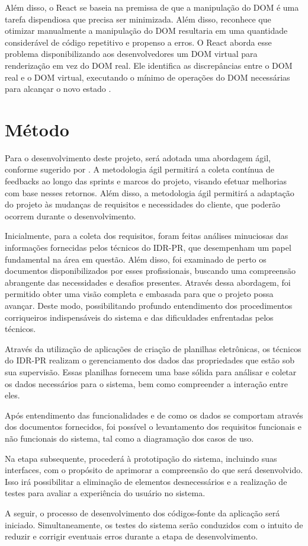 Além disso, o React se baseia na premissa de que a manipulação do \gls{DOM} é uma tarefa dispendiosa que precisa ser minimizada. Além disso, reconhece que otimizar manualmente a manipulação do \gls{DOM} resultaria em uma quantidade considerável de código repetitivo e propenso a erros. O React aborda esse problema disponibilizando aos desenvolvedores um \gls{DOM} virtual para renderização em vez do \gls{DOM} real. Ele identifica as discrepâncias entre o \gls{DOM} real e o \gls{DOM} virtual, executando o mínimo de operações do \gls{DOM} necessárias para alcançar o novo estado \cite{Vipul:2016:ReactJSByExampleBuildingModernWebApplications}.

\section{Método}\label{sec:metodo}

Para o desenvolvimento deste projeto, será adotada uma abordagem ágil, conforme sugerido por . A metodologia ágil permitirá a coleta contínua de feedbacks ao longo das sprints e marcos do projeto, visando efetuar melhorias com base nesses retornos.
Além disso, a metodologia ágil permitirá a adaptação do projeto às mudanças de requisitos e necessidades do cliente, que poderão ocorrem durante o desenvolvimento.

Inicialmente, para a coleta dos requisitos, foram feitas análises minuciosas das informações fornecidas pelos técnicos do \gls{IDR-PR}, que desempenham um papel fundamental na área em questão. Além disso, foi examinado de perto os documentos disponibilizados por esses profissionais, buscando uma compreensão abrangente das necessidades e desafios presentes. Através dessa abordagem, foi permitido obter uma visão completa e embasada para que o projeto possa avançar. Deste modo, possibilitando profundo entendimento dos procedimentos corriqueiros indispensáveis do sistema e das dificuldades enfrentadas pelos técnicos.

Através da utilização de aplicações de criação de planilhas eletrônicas, os técnicos do \gls{IDR-PR} realizam o gerenciamento dos dados das propriedades que estão sob sua supervisão. Essas planilhas fornecem uma base sólida para análisar e coletar os dados necessários para o sistema, bem como compreender a interação entre eles.

Após entendimento das funcionalidades e de como os dados se comportam através dos documentos fornecidos, foi possível o levantamento dos requisitos funcionais e não funcionais do sistema, tal como a diagramação dos casos de uso.

Na etapa subsequente, procederá à prototipação do sistema, incluindo suas interfaces, com o propósito de aprimorar a compreensão do que será desenvolvido. Isso irá possibilitar a eliminação de elementos desnecessários e a realização de testes para avaliar a experiência do usuário no sistema.

A seguir, o processo de desenvolvimento dos códigos-fonte da aplicação será iniciado. Simultaneamente, os testes do sistema serão conduzidos com o intuito de reduzir e corrigir eventuais erros durante a etapa de desenvolvimento.

